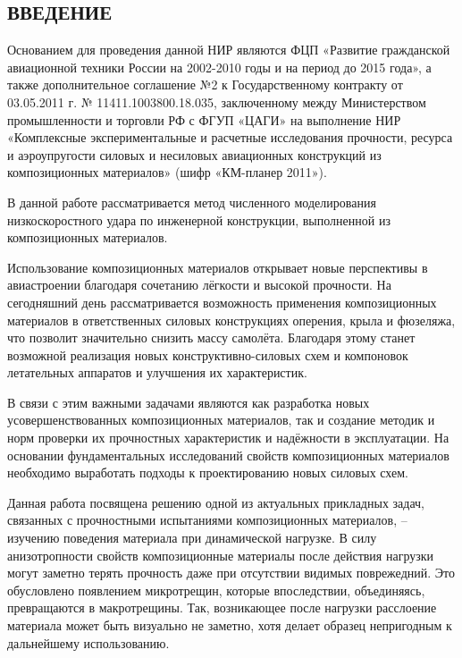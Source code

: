 \begin{center}\section*{ВВЕДЕНИЕ}\end{center}

Основанием для проведения данной НИР являются ФЦП «Развитие гражданской авиационной техники России на 2002-2010 годы и на период до 2015 года», а также дополнительное соглашение №2 к Государственному контракту от 03.05.2011 г. № 11411.1003800.18.035, заключенному между Министерством промышленности и торговли РФ с ФГУП «ЦАГИ» на выполнение НИР «Комплексные экспериментальные и расчетные исследования прочности, ресурса и аэроупругости силовых и несиловых авиационных конструкций из композиционных материалов» (шифр «КМ-планер 2011»).

В данной работе рассматривается метод численного моделирования низкоскоростного
удара по инженерной конструкции, выполненной из композиционных материалов.

Использование композиционных материалов открывает новые перспективы в авиастроении 
благодаря сочетанию лёгкости и высокой прочности. На сегодняшний день рассматривается 
возможность применения композиционных материалов в ответственных силовых конструкциях 
оперения, крыла и фюзеляжа, что позволит значительно снизить массу самолёта. Благодаря этому 
станет возможной реализация новых конструктивно-силовых схем и компоновок летательных 
аппаратов и улучшения их характеристик.

В связи с этим важными задачами являются как разработка новых усовершенствованных 
композиционных материалов, так и создание методик и норм проверки их прочностных характеристик 
и надёжности в эксплуатации. На основании фундаментальных исследований свойств композиционных 
материалов необходимо выработать подходы к проектированию новых силовых схем.

Данная работа посвящена решению одной из актуальных прикладных задач, связанных с 
прочностными испытаниями композиционных материалов, -- изучению поведения материала при 
динамической нагрузке. В силу анизотропности свойств композиционные материалы после
действия нагрузки могут заметно терять прочность даже при отсутствии видимых поврежедний.
Это обусловлено появлением микротрещин, которые впоследствии, объединяясь,
превращаются в макротрещины. Так, возникающее после нагрузки расслоение
материала может быть визуально не заметно, хотя делает образец непригодным к
дальнейшему использованию.

